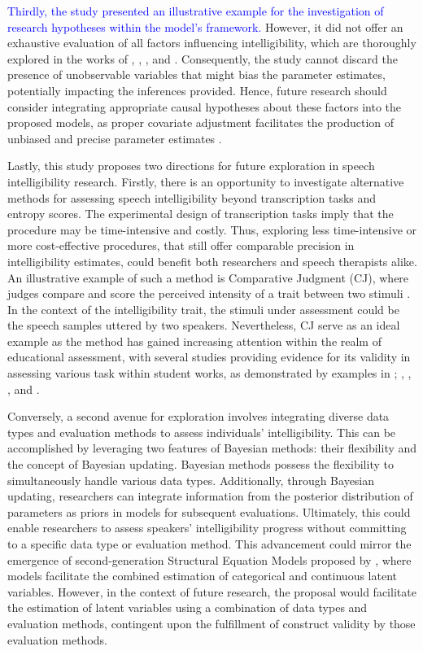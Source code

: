 \documentclass[
  authoryear,
  preprint,
  1p]{elsarticle}
\begin{document}
\textcolor{blue}{Thirdly, the study presented an illustrative example for the
investigation of research hypotheses within the model's framework.}
However, it did not offer an exhaustive evaluation of all factors
influencing intelligibility, which are thoroughly explored in the works
of \citet{Niparko_et_al_2010}, \citet{Boons_et_al_2012},
\citet{Gillis_2018}, and \citet{Fagan_et_al_2020}. Consequently, the
study cannot discard the presence of unobservable variables that might
bias the parameter estimates, potentially impacting the inferences
provided. Hence, future research should consider integrating appropriate
causal hypotheses about these factors into the proposed models, as
proper covariate adjustment facilitates the production of unbiased and
precise parameter estimates
\citep{Cinelli_et_al_2021, Deffner_et_al_2022}.

Lastly, this study proposes two directions for future exploration in
speech intelligibility research. Firstly, there is an opportunity to
investigate alternative methods for assessing speech intelligibility
beyond transcription tasks and entropy scores. The experimental design
of transcription tasks imply that the procedure may be time-intensive
and costly. Thus, exploring less time-intensive or more cost-effective
procedures, that still offer comparable precision in intelligibility
estimates, could benefit both researchers and speech therapists alike.
An illustrative example of such a method is Comparative Judgment (CJ),
where judges compare and score the perceived intensity of a trait
between two stimuli \citep{Thurstone_1927}. In the context of the
intelligibility trait, the stimuli under assessment could be the speech
samples uttered by two speakers. Nevertheless, CJ serve as an ideal
example as the method has gained increasing attention within the realm
of educational assessment, with several studies providing evidence for
its validity in assessing various task within student works, as
demonstrated by examples in \citet{Pollitt_2012a};
\citet{Pollitt_2012b}, \citet{Lesterhuis_2018}, \citet{vanDaal_2020},
and \citet{Verhavert_et_al_2019}.

Conversely, a second avenue for exploration involves integrating diverse
data types and evaluation methods to assess individuals'
intelligibility. This can be accomplished by leveraging two features of
Bayesian methods: their flexibility and the concept of Bayesian
updating. Bayesian methods possess the flexibility to simultaneously
handle various data types. Additionally, through Bayesian updating,
researchers can integrate information from the posterior distribution of
parameters as priors in models for subsequent evaluations. Ultimately,
this could enable researchers to assess speakers' intelligibility
progress without committing to a specific data type or evaluation
method. This advancement could mirror the emergence of second-generation
Structural Equation Models proposed by \citet{Muthen_2001}, where models
facilitate the combined estimation of categorical and continuous latent
variables. However, in the context of future research, the proposal
would facilitate the estimation of latent variables using a combination
of data types and evaluation methods, contingent upon the fulfillment of
construct validity by those evaluation methods.
\end{document}
